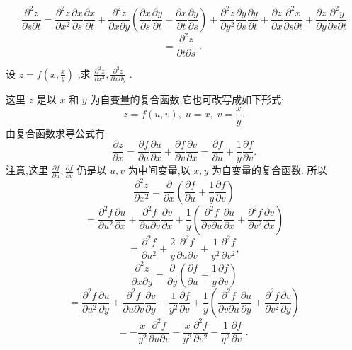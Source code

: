 \[
\frac{{\partial }^{2}z}{\partial s\partial t} = \frac{{\partial }^{2}z}{\partial {x}^{2}}\frac{\partial x}{\partial s}\frac{\partial x}{\partial t} + \frac{{\partial }^{2}z}{\partial x\partial y}\left( {\frac{\partial x}{\partial s}\frac{\partial y}{\partial t} + \frac{\partial x}{\partial t}\frac{\partial y}{\partial s}}\right)  + \frac{{\partial }^{2}z}{\partial {y}^{2}}\frac{\partial y}{\partial s}\frac{\partial y}{\partial t} + \frac{\partial z}{\partial x}\frac{{\partial }^{2}x}{\partial s\partial t} + \frac{\partial z}{\partial y}\frac{{\partial }^{2}y}{\partial s\partial t}
\]
\[
= \frac{{\partial }^{2}z}{\partial t\partial s}\text{ . }
\]
\begin{example}

\end{example}
设 \(z = f\left( {x,\frac{x}{y}}\right)\) ,求 \(\frac{{\partial }^{2}z}{\partial {x}^{2}},\frac{{\partial }^{2}z}{\partial x\partial y}\) .

\begin{solution}

\end{solution}
这里 \(z\) 是以 \(x\) 和 \(y\) 为自变量的复合函数,它也可改写成如下形式:
\[
z = f\left( {u,v}\right) ,\;u = x,\;v = \frac{x}{y}.
\]
由复合函数求导公式有
\[
\frac{\partial z}{\partial x} = \frac{\partial f}{\partial u}\frac{\partial u}{\partial x} + \frac{\partial f}{\partial v}\frac{\partial v}{\partial x} = \frac{\partial f}{\partial u} + \frac{1}{y}\frac{\partial f}{\partial v}.
\]
注意,这里 \(\frac{\partial f}{\partial u},\frac{\partial f}{\partial v}\) 仍是以 \(u,v\) 为中间变量,以 \(x,y\) 为自变量的复合函数. 所以
\[
\frac{{\partial }^{2}z}{\partial {x}^{2}} = \frac{\partial }{\partial x}\left( {\frac{\partial f}{\partial u} + \frac{1}{y}\frac{\partial f}{\partial v}}\right)
\]
\[
= \frac{{\partial }^{2}f}{\partial {u}^{2}}\frac{\partial u}{\partial x} + \frac{{\partial }^{2}f}{\partial u\partial v}\frac{\partial v}{\partial x} + \frac{1}{y}\left( {\frac{{\partial }^{2}f}{\partial v\partial u}\frac{\partial u}{\partial x} + \frac{{\partial }^{2}f}{\partial {v}^{2}}\frac{\partial v}{\partial x}}\right)
\]
\[
= \frac{{\partial }^{2}f}{\partial {u}^{2}} + \frac{2}{y}\frac{{\partial }^{2}f}{\partial u\partial v} + \frac{1}{{y}^{2}}\frac{{\partial }^{2}f}{\partial {v}^{2}},
\]
\[
\frac{{\partial }^{2}z}{\partial x\partial y} = \frac{\partial }{\partial y}\left( {\frac{\partial f}{\partial u} + \frac{1}{y}\frac{\partial f}{\partial v}}\right)
\]
\[
= \frac{{\partial }^{2}f}{\partial {u}^{2}}\frac{\partial u}{\partial y} + \frac{{\partial }^{2}f}{\partial u\partial v}\frac{\partial v}{\partial y} - \frac{1}{{y}^{2}}\frac{\partial f}{\partial v} + \frac{1}{y}\left( {\frac{{\partial }^{2}f}{\partial v\partial u}\frac{\partial u}{\partial y} + \frac{{\partial }^{2}f}{\partial {v}^{2}}\frac{\partial v}{\partial y}}\right)
\]
\[
=  - \frac{x}{{y}^{2}}\frac{{\partial }^{2}f}{\partial u\partial v} - \frac{x}{{y}^{3}}\frac{{\partial }^{2}f}{\partial {v}^{2}} - \frac{1}{{y}^{2}}\frac{\partial f}{\partial v}\text{ . }
\]

